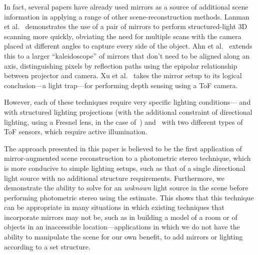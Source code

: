 In fact, several papers have already used mirrors as a source of additional scene information in applying a range of other scene-reconstruction methods. Lanman et al.~\cite{lanman} demonstrates the use of a pair of mirrors to perform structured-light 3D scanning more quickly, obviating the need for multiple scans with the camera placed at different angles to capture every side of the object. Ahn et al.~\cite{ahn} extends this to a larger ``kaleidoscope'' of mirrors that don't need to be aligned along an axis, distinguishing pixels by reflection paths using the epipolar relationship between projector and camera. Xu et al.~\cite{xu} takes the mirror setup to its logical conclusion---a light trap---for performing depth sensing using a ToF camera.

However, each of these techniques require very specific lighting conditions---\cite{lanman} and~\cite{ahn} with structured lighting projections (with the additional constraint of directional lighting, using a Fresnel lens, in the case of~\cite{lanman}) and~\cite{xu} with two different types of ToF sensors, which require active illumination.

The approach presented in this paper is believed to be the first application of mirror-augmented scene reconstruction to a photometric stereo technique, which is more conducive to simple lighting setups, such as that of a single directional light source with no additional structure requirements. Furthermore, we demonstrate the ability to solve for an \textit{unknown} light source in the scene before performing photometric stereo using the estimate. This shows that this technique can be appropriate in many situations in which existing techniques that incorporate mirrors may not be, such as in building a model of a room or of objects in an inaccessible location---applications in which we do not have the ability to manipulate the scene for our own benefit, to add mirrors or lighting according to a set structure.

